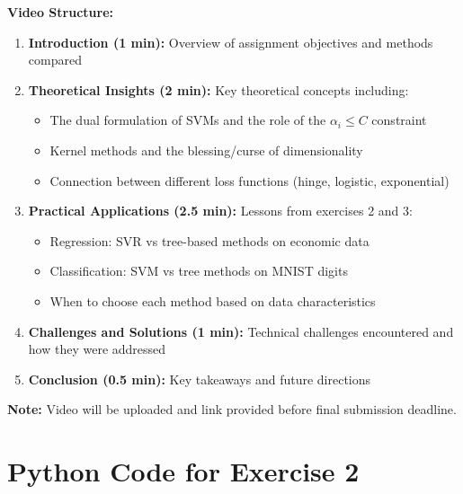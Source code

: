 \documentclass[12pt,a4paper]{article}
\theoremstyle{definition}
\begin{document}
\textbf{Video Structure:}
\begin{enumerate}
\item \textbf{Introduction (1 min):} Overview of assignment objectives and methods compared
\item \textbf{Theoretical Insights (2 min):} Key theoretical concepts including:
   \begin{itemize}
   \item The dual formulation of SVMs and the role of the $\alpha_i \leq C$ constraint
   \item Kernel methods and the blessing/curse of dimensionality
   \item Connection between different loss functions (hinge, logistic, exponential)
   \end{itemize}
\item \textbf{Practical Applications (2.5 min):} Lessons from exercises 2 and 3:
   \begin{itemize}
   \item Regression: SVR vs tree-based methods on economic data
   \item Classification: SVM vs tree methods on MNIST digits
   \item When to choose each method based on data characteristics
   \end{itemize}
\item \textbf{Challenges and Solutions (1 min):} Technical challenges encountered and how they were addressed
\item \textbf{Conclusion (0.5 min):} Key takeaways and future directions
\end{enumerate}

\textbf{Note:} Video will be uploaded and link provided before final submission deadline.

\appendix

\section{Python Code for Exercise 2}
\end{document}
